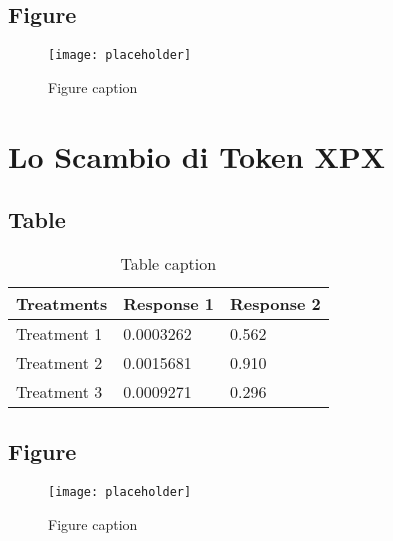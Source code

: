 \documentclass[11pt,fleqn,oneside]{book} %
\begin{document}

\section{Figure}

\begin{figure}[h]
	\centering\texttt{[image: placeholder]}
	\caption{Figure caption}
\end{figure}




\chapter{Lo Scambio di Token XPX}

\section{Table}

\begin{table}[h]
	\centering
	\begin{tabular}{l l l}
		\toprule
		\textbf{Treatments} & \textbf{Response 1} & \textbf{Response 2} \\
		\midrule
		Treatment 1         & 0.0003262           & 0.562               \\
		Treatment 2         & 0.0015681           & 0.910               \\
		Treatment 3         & 0.0009271           & 0.296               \\
		\bottomrule
	\end{tabular}
	\caption{Table caption}
\end{table}


\section{Figure}

\begin{figure}[h]
	\centering\texttt{[image: placeholder]}
	\caption{Figure caption}
\end{figure}
\end{document}
